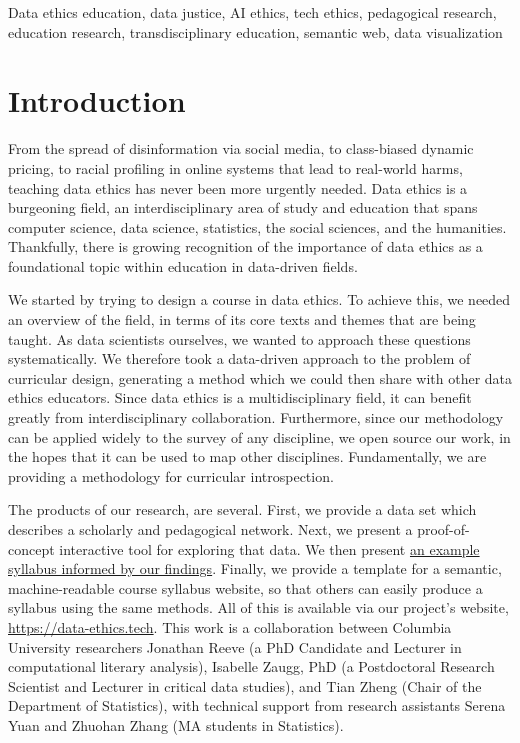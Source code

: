 \documentclass[
]{article}
\begin{document}
Data ethics education, data justice, AI ethics, tech ethics, pedagogical
research, education research, transdisciplinary education, semantic web,
data visualization

\hypertarget{introduction}{%
\section{Introduction}\label{introduction}}

From the spread of disinformation via social media, to class-biased
dynamic pricing, to racial profiling in online systems that lead to
real-world harms, teaching data ethics has never been more urgently
needed. Data ethics is a burgeoning field, an interdisciplinary area of
study and education that spans computer science, data science,
statistics, the social sciences, and the humanities. Thankfully, there
is growing recognition of the importance of data ethics as a
foundational topic within education in data-driven fields.

We started by trying to design a course in data ethics. To achieve this,
we needed an overview of the field, in terms of its core texts and
themes that are being taught. As data scientists ourselves, we wanted to
approach these questions systematically. We therefore took a data-driven
approach to the problem of curricular design, generating a method which
we could then share with other data ethics educators. Since data ethics
is a multidisciplinary field, it can benefit greatly from
interdisciplinary collaboration. Furthermore, since our methodology can
be applied widely to the survey of any discipline, we open source our
work, in the hopes that it can be used to map other disciplines.
Fundamentally, we are providing a methodology for curricular
introspection.

The products of our research, are several. First, we provide a data set
which describes a scholarly and pedagogical network. Next, we present a
proof-of-concept interactive tool for exploring that data. We then
present \href{http://data-ethics.jonreeve.com/}{an example syllabus
informed by our findings}. Finally, we provide a template for a
semantic, machine-readable course syllabus website, so that others can
easily produce a syllabus using the same methods. All of this is
available via our project's website, \url{https://data-ethics.tech}.
This work is a collaboration between Columbia University researchers
Jonathan Reeve (a PhD Candidate and Lecturer in computational literary
analysis), Isabelle Zaugg, PhD (a Postdoctoral Research Scientist and
Lecturer in critical data studies), and Tian Zheng (Chair of the
Department of Statistics), with technical support from research
assistants Serena Yuan and Zhuohan Zhang (MA students in Statistics).
\end{document}
